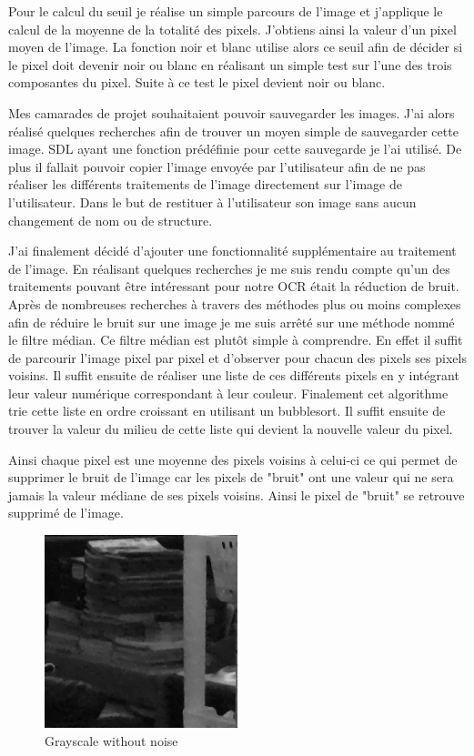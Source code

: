 \documentclass[12pt]{report}
\begin{document}
\newpage

Pour le calcul du seuil je réalise un simple parcours de l’image et j’applique le calcul de la moyenne de la totalité des pixels. J’obtiens ainsi la valeur d’un pixel moyen de l’image. La fonction noir et blanc utilise alors ce seuil afin de décider si le pixel doit devenir noir ou blanc en réalisant un simple test sur l’une des trois composantes du pixel. Suite à ce test le pixel devient noir ou blanc.

Mes camarades de projet souhaitaient pouvoir sauvegarder les images. J’ai alors réalisé quelques recherches afin de trouver un moyen simple de sauvegarder cette image. SDL ayant une fonction prédéfinie pour cette sauvegarde je l’ai utilisé. De plus il fallait pouvoir copier l’image envoyée par l’utilisateur afin de ne pas réaliser les différents traitements de l’image directement sur l’image de l’utilisateur. Dans le but de restituer à l’utilisateur son image sans aucun changement de nom ou de structure.

J’ai finalement décidé d’ajouter une fonctionnalité supplémentaire au traitement de l’image. En réalisant quelques recherches je me suis rendu compte qu’un des traitements pouvant être intéressant pour notre OCR était la réduction de bruit. Après de nombreuses recherches à travers des méthodes plus ou moins complexes afin de réduire le bruit sur une image je me suis arrêté sur une méthode nommé le filtre médian. Ce filtre médian est plutôt simple à comprendre. En effet il suffit de parcourir l’image pixel par pixel et d’observer pour chacun des pixels ses pixels voisins. Il suffit ensuite de réaliser une liste de ces différents pixels en y intégrant leur valeur numérique correspondant à leur couleur. Finalement cet algorithme trie cette liste en ordre croissant en utilisant un bubblesort. Il suffit ensuite de trouver la valeur du milieu de cette liste qui devient la nouvelle valeur du pixel. 

\newpage

Ainsi chaque pixel est une moyenne des pixels voisins à celui-ci ce qui permet de supprimer le bruit de l’image car les pixels de "bruit" ont une valeur qui ne sera jamais la valeur médiane de ses pixels voisins. Ainsi le pixel de "bruit" se retrouve supprimé de l’image.

\begin{figure}[H]
    \centering
    \includegraphics[width=0.5\textwidth]{noiseless_grayscale}
    \caption{Grayscale without noise}
\end{figure}
\end{document}
